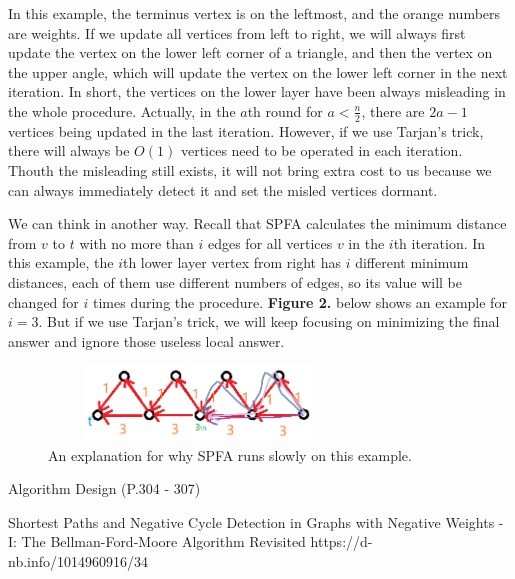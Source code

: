\documentclass{article}
\begin{document}
In this example, the terminus vertex is on the leftmost, and the orange numbers are weights. If we update all vertices from left to right, we will always first update the vertex on the lower left corner of a triangle, and then the vertex on the upper angle, which will update the vertex on the lower left corner in the next iteration. In short, the vertices on the lower layer have been always misleading in the whole procedure. Actually, in the $a$th round for $a<\frac{n}{2}$, there are $2a-1$ vertices being updated in the last iteration. However, if we use Tarjan's trick, there will always be $O(1)$ vertices need to be operated in each iteration. Thouth the misleading still exists, it will not bring extra cost to us because we can always immediately detect it and set the misled vertices dormant.

We can think in another way. Recall that SPFA calculates the minimum distance from $v$ to $t$ with no more than $i$ edges for all vertices $v$ in the $i$th iteration. In this example, the $i$th lower layer vertex from right has $i$ different minimum distances, each of them use different numbers of edges, so its value will be changed for $i$ times during the procedure. \textbf{Figure 2.} below shows an example for $i=3$. But if we use Tarjan's trick, we will keep focusing on minimizing the final answer and ignore those useless local answer.

\begin{figure}[h]  %
    \centering
    \includegraphics[height=2cm,width=8cm]{figure/2.png}
    \caption{An explanation for why SPFA runs slowly on this example.}
    \label{2}
\end{figure}

\newpage  %

\renewcommand\refname{References}  %
\begin{thebibliography}{99}
     Algorithm Design (P.304 - 307)

     Shortest Paths and Negative Cycle Detection in Graphs with Negative Weights - I: The Bellman-Ford-Moore Algorithm Revisited
    https://d-nb.info/1014960916/34

\end{thebibliography}
\end{document}
